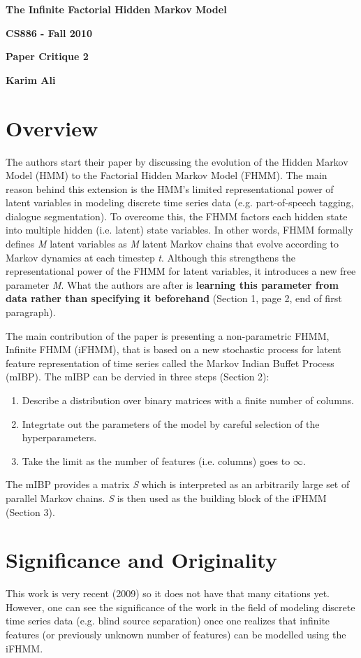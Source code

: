 \documentclass[11pt,a4paper]{article}
\begin{document}
\centerline{\sc \large \textbf{The Infinite Factorial Hidden Markov Model}}
\centerline{\textbf{CS886 - Fall 2010}}
\centerline{\textbf{Paper Critique 2}}
\centerline{\textbf{Karim Ali}}
\vspace{2pc}

\section{Overview}
The authors start their paper by discussing the evolution of the Hidden Markov Model (HMM) to the Factorial Hidden Markov Model (FHMM). The main reason
behind this extension is the HMM's limited representational power of latent variables in modeling discrete time series data (e.g. part-of-speech tagging,
dialogue segmentation). To overcome this, the FHMM factors each hidden state into multiple hidden (i.e. latent) state variables. In other words, FHMM formally
defines \textit{M} latent variables as \textit{M} latent Markov chains that evolve according to Markov dynamics at each timestep \textit{t}. Although this
strengthens the representational power of the FHMM for latent variables, it introduces a new free parameter \textit{M}. What the authors are after is
\textbf{learning this parameter from data rather than specifying it beforehand} (Section 1, page 2, end of first paragraph).

The main contribution of the paper is presenting a non-parametric FHMM, Infinite FHMM (iFHMM), that is based on a new stochastic process for latent feature
representation of time series called the Markov Indian Buffet Process (mIBP). The mIBP can be dervied in three steps (Section 2):

\begin{enumerate}
 \item Describe a distribution over binary matrices with a finite number of columns.
 \item Integrtate out the parameters of the model by careful selection of the hyperparameters.
 \item Take the limit as the number of features (i.e. columns) goes to $\infty$.
\end{enumerate}

The mIBP provides a matrix \textit{S} which is interpreted as an arbitrarily large set of parallel Markov chains. \textit{S} is then used as the building block
of the iFHMM (Section 3).

\section{Significance and Originality}
This work is very recent (2009) so it does not have that many citations yet. However, one can see the significance of the work in the field of modeling
discrete time series data (e.g. blind source separation) once one realizes that infinite features (or previously unknown number of features) can be modelled
using the iFHMM.
\end{document}
